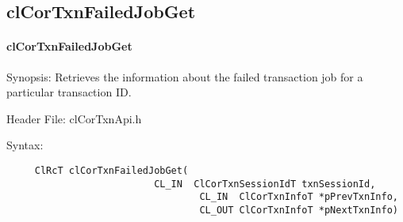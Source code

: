\begin{flushleft}
\subsection{clCorTxnFailedJobGet}
\hypertarget{pagecor144}{}\paragraph{cl\-Cor\-Txn\-Failed\-Job\-Get}\label{pagecor144}
\begin{Desc}
\item[Synopsis:] Retrieves the information about the failed transaction job for a particular transaction ID.\end{Desc}
\begin{Desc}
\item[Header File:]clCorTxnApi.h\end{Desc}
\begin{Desc}
\item[Syntax:]

\footnotesize\begin{verbatim}     ClRcT clCorTxnFailedJobGet( 
					      CL_IN  ClCorTxnSessionIdT txnSessionId, 
			                      CL_IN  ClCorTxnInfoT *pPrevTxnInfo, 
			                      CL_OUT ClCorTxnInfoT *pNextTxnInfo)


\end{verbatim}
\end{Desc}
\end{flushleft}
